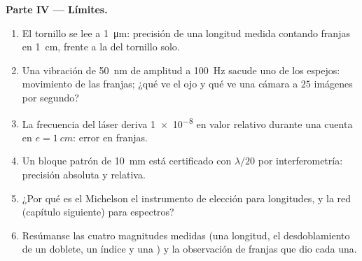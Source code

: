 \begin{problem}
\medskip
\noindent\textbf{Parte IV --- Límites.}
\begin{enumerate}[resume]
  \item El tornillo se lee a \qty{1}{\micro m}: precisión de una longitud
        medida contando franjas en \qty{1}{cm}, frente a la del tornillo
        solo.
  \item Una vibración de \qty{50}{nm} de amplitud a \qty{100}{Hz} sacude uno de los
        espejos: movimiento de las franjas; ¿qué ve el ojo y qué ve una
        cámara a $25$ imágenes por segundo?
  \item La frecuencia del láser deriva \qty{1e-8}{} en valor relativo
        durante una cuenta en $e = \qty{1}{cm}$: error en franjas.
  \item Un bloque patrón de \qty{10}{mm} está certificado con $\lambda/20$ por
        interferometría: precisión absoluta y relativa.
  \item ¿Por qué es el Michelson el instrumento de elección para longitudes, y
        la red (capítulo siguiente) para espectros?
  \item Resúmanse las cuatro magnitudes medidas (una longitud, el desdoblamiento
        de un doblete, un índice y una ) y la observación
        de franjas que dio cada una.
\end{enumerate}
\end{problem}
